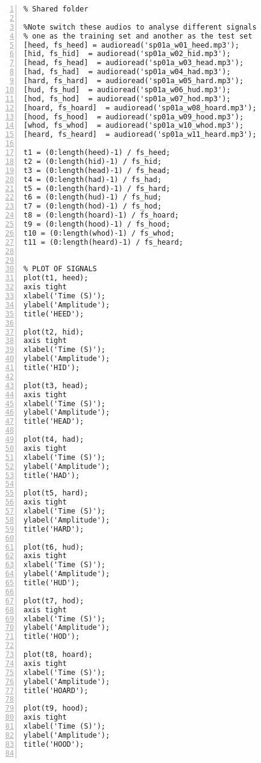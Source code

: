 \documentclass{article}
\begin{document}
\begin{lstlisting}[frame=single, numbers=left, style=Matlab-editor, caption={shared\_feature\_extraction.mlx}, label={lst:shared_feature_extraction}]
  % FEATURE EXTRACTION // FEATURE EXTRACTION // FEATURE EXTRACTION // FEATURE EXTRACTION
% Shared folder

%Note switch these audios to analyse different signals
% one as the training set and another as the test set
[heed, fs_heed] = audioread('sp01a_w01_heed.mp3'); 
[hid, fs_hid]  = audioread('sp01a_w02_hid.mp3');
[head, fs_head]  = audioread('sp01a_w03_head.mp3');
[had, fs_had]  = audioread('sp01a_w04_had.mp3');
[hard, fs_hard]  = audioread('sp01a_w05_hard.mp3');
[hud, fs_hud]  = audioread('sp01a_w06_hud.mp3');
[hod, fs_hod]  = audioread('sp01a_w07_hod.mp3');
[hoard, fs_hoard]  = audioread('sp01a_w08_hoard.mp3');
[hood, fs_hood]  = audioread('sp01a_w09_hood.mp3');
[whod, fs_whod]  = audioread('sp01a_w10_whod.mp3');
[heard, fs_heard]  = audioread('sp01a_w11_heard.mp3');

t1 = (0:length(heed)-1) / fs_heed; 
t2 = (0:length(hid)-1) / fs_hid;  
t3 = (0:length(head)-1) / fs_head; 
t4 = (0:length(had)-1) / fs_had;
t5 = (0:length(hard)-1) / fs_hard; 
t6 = (0:length(hud)-1) / fs_hud;
t7 = (0:length(hod)-1) / fs_hod; 
t8 = (0:length(hoard)-1) / fs_hoard;
t9 = (0:length(hood)-1) / fs_hood; 
t10 = (0:length(whod)-1) / fs_whod;
t11 = (0:length(heard)-1) / fs_heard; 


% PLOT OF SIGNALS
plot(t1, heed);  
axis tight
xlabel('Time (S)');
ylabel('Amplitude');
title('HEED');

plot(t2, hid);  
axis tight
xlabel('Time (S)');
ylabel('Amplitude');
title('HID');

plot(t3, head);  
axis tight
xlabel('Time (S)');
ylabel('Amplitude');
title('HEAD');

plot(t4, had);  
axis tight
xlabel('Time (S)');
ylabel('Amplitude');
title('HAD');
 
plot(t5, hard);  
axis tight
xlabel('Time (S)');
ylabel('Amplitude');
title('HARD');

plot(t6, hud);  
axis tight
xlabel('Time (S)');
ylabel('Amplitude');
title('HUD');

plot(t7, hod);  
axis tight
xlabel('Time (S)');
ylabel('Amplitude');
title('HOD');

plot(t8, hoard);  
axis tight
xlabel('Time (S)');
ylabel('Amplitude');
title('HOARD');

plot(t9, hood);  
axis tight
xlabel('Time (S)');
ylabel('Amplitude');
title('HOOD');


\end{lstlisting}
\end{document}
